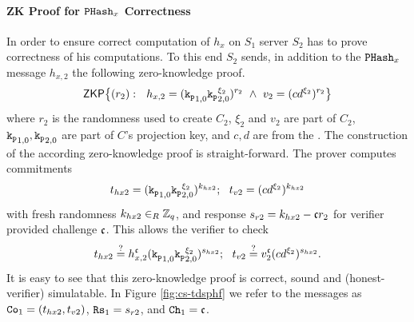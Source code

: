 \paragraph{ZK Proof for $\mathtt{PHash}_x$ Correctness}
In order to ensure correct computation of $h_x$ on $S_1$ server $S_2$ has to prove correctness of his computations.
To this end $S_2$ sends, in addition to the $\mathtt{PHash}_x$ message $h_{x,2}$ the following zero-knowledge proof.
\begin{equation}
    \mathsf{ZKP}\big\{ (r_2):~~ h_{x,2} = (\mathtt{k_p}_{1,0} \mathtt{k_p}_{2,0}^{\xi_2})^{r_2} ~ \wedge ~ v_2=(cd^{\xi_2})^{r_2} \big\}
\end{equation}
where $r_2$ is the randomness used to create $C_2$, $\xi_2$ and $v_2$ are part of $C_2$, $\mathtt{k_p}_{1,0},\mathtt{k_p}_{2,0}$ are part of $C$'s projection key, and $c,d$ are from the \crs.
The construction of the according zero-knowledge proof is straight-forward. 
The prover computes commitments
\[ t_{hx2} = (\mathtt{k_p}_{1,0} \mathtt{k_p}_{2,0}^{\xi_2})^{k_{hx2}}; ~~ t_{v2} = (cd^{\xi_2})^{k_{hx2}} \]
with fresh randomness $k_{hx2}\in_R\mathbb{Z}_q$, and response $s_{r2} = k_{hx2} - \mathfrak{c} r_2$ for verifier provided challenge $\mathfrak{c}$.
This allows the verifier to check
\[ t_{hx2} \stackrel{?}{=} h_{x,2}^\mathfrak{c} (\mathtt{k_p}_{1,0} \mathtt{k_p}_{2,0}^{\xi_2})^{s_{hx2}}; ~~ t_{v2} \stackrel{?}{=} v_2^\mathfrak{c} (cd^{\xi_2})^{s_{hx2}}. \]
It is easy to see that this zero-knowledge proof is correct, sound and (honest-verifier) simulatable.
In Figure \ref{fig:cs-tdsphf} we refer to the messages as $\mathtt{Co}_{1}=(t_{hx2}, t_{v2})$, $\mathtt{Rs}_{1}=s_{r2}$, and $\mathtt{Ch}_{1}=\mathfrak{c}$.

